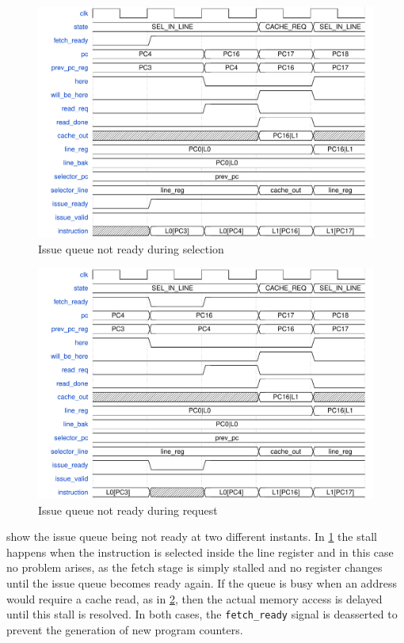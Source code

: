 \pagebreak
\begin{figure}[!ht]
  \centering
  \includegraphics[scale=.65]{img/fetch03.pdf}
  \caption{Issue queue not ready during selection}
  \label{fig:fetch03}
\end{figure}
\begin{figure}[!ht]
  \centering
  \includegraphics[scale=.65]{img/fetch04.pdf}
  \caption{Issue queue not ready during request}
  \label{fig:fetch04}
\end{figure}
 show the issue queue being not ready at two different instants. In \cref{fig:fetch03} the stall happens when the instruction is selected inside the line register and in this case no problem arises, as the fetch stage is simply stalled and no register changes until the issue queue becomes ready again. If the queue is busy when an address would require a cache read, as in \cref{fig:fetch04}, then the actual memory access is delayed until this stall is resolved.  In both cases, the \texttt{fetch\_ready} signal is deasserted to prevent the generation of new program counters.

